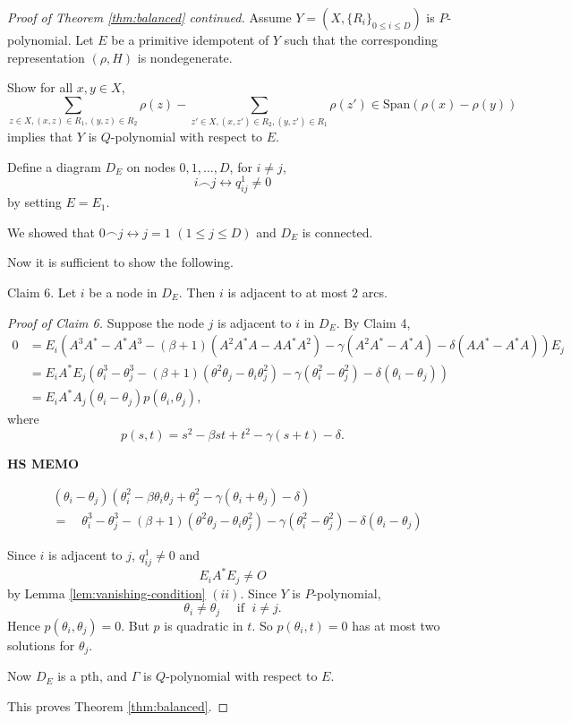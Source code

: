 \documentclass[
]{book}
\theoremstyle{definition}
\theoremstyle{definition}
\theoremstyle{definition}
\theoremstyle{definition}
\theoremstyle{remark}
\begin{document}
\begin{proof}[Proof of Theorem \ref{thm:balanced} continued]
Assume \(Y = (X, \{R_i\}_{0\leq i\leq D})\) is \(P\)-polynomial.
Let \(E\) be a primitive idempotent of \(Y\) such that the corresponding representation \((\rho, H)\) is nondegenerate.

Show for all \(x, y\in X\),
\[\sum_{z\in X, (x,z)\in R_1, (y,z)\in R_2}\rho(z) - \sum_{z'\in X, (x,z')\in R_2, (y,z')\in R_1}\rho(z') \in \mathrm{Span}(\rho(x)-\rho(y))\]
implies that \(Y\) is \(Q\)-polynomial with respect to \(E\).

Define a diagram \(D_E\) on nodes \(0, 1, \ldots, D\), for \(i\neq j\),
\[i \frown j \leftrightarrow q^1_{ij}\neq 0\]
by setting \(E = E_1\).

We showed that \(0 \frown j \leftrightarrow j = 1\) \((1\leq j\leq D)\) and \(D_E\) is connected.

Now it is sufficient to show the following.

Claim 6. Let \(i\) be a node in \(D_E\). Then \(i\) is adjacent to at most \(2\) arcs.

\emph{Proof of Claim 6.}
Suppose the node \(j\) is adjacent to \(i\) in \(D_E\). By Claim 4,
\begin{align}
0 & = E_i(A^3A^* - A^*A^3 - (\beta+1)(A^2A^*A-AA^*A^2) - \gamma(A^2A^*-A^*A) - \delta(AA^*-A^*A))E_j\\
& = E_iA^*E_j(\theta^3_i-\theta^3_j-(\beta+1)(\theta^2\theta_j - \theta_i\theta_j^2)-\gamma(\theta_i^2-\theta_j^2)-\delta(\theta_i-\theta_j))\\
& = E_iA^*A_j(\theta_i-\theta_j)p(\theta_i, \theta_j),
\end{align}
where
\[p(s,t) = s^2 - \beta st + t^2 - \gamma(s+t) - \delta.\]

\textbf{HS MEMO}

\begin{align}
& (\theta_i-\theta_j)(\theta_i^2 - \beta \theta_i\theta_j + \theta_j^2 - \gamma(\theta_i + \theta_j) - \delta)\\
& = \quad \theta^3_i-\theta^3_j-(\beta+1)(\theta^2\theta_j - \theta_i\theta_j^2)-\gamma(\theta_i^2-\theta_j^2)-\delta(\theta_i-\theta_j)
\end{align}

Since \(i\) is adjacent to \(j\), \(q^1_{ij}\neq 0\) and
\[E_iA^*E_j\neq O\]
by Lemma \ref{lem:vanishing-condition} \((ii)\).
Since \(Y\) is \(P\)-polynomial,
\[\theta_i \neq \theta_j \quad \text{ if }\; i\neq j.\]
Hence \(p(\theta_i,\theta_j) = 0\). But \(p\) is quadratic in \(t\). So \(p(\theta_i,t) = 0\) has at most two solutions for \(\theta_j\).

Now \(D_E\) is a pth, and \(\Gamma\) is \(Q\)-polynomial with respect to \(E\).

This proves Theorem \ref{thm:balanced}.
\end{proof}
\end{document}
